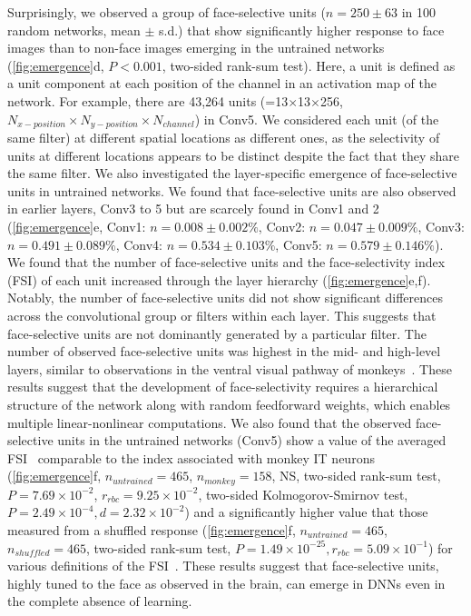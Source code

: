 \documentclass[sn-mathphys-num]{sn-jnl}%
\theoremstyle{thmstyleone}%
\theoremstyle{thmstyletwo}%
\theoremstyle{thmstylethree}%
\begin{document}
Surprisingly, we observed a group of face-selective units ($ n = 250 \pm 63 $ in 100 random networks, mean $ \pm $ s.d.) that show significantly higher response to face images than to non-face images emerging in the untrained networks (\ref{fig:emergence}d, $ P<0.001 $, two-sided rank-sum test).
Here, a unit is defined as a unit component at each position of the channel in an activation map of the network.
For example, there are 43,264 units (=13$\times$13$\times$256, $ N_{x-position} \times N_{y-position} \times N_{channel} $) in Conv5.
We considered each unit (of the same filter) at different spatial locations as different ones, as the selectivity of units at different locations appears to be distinct despite the fact that they share the same filter.
We also investigated the layer-specific emergence of face-selective units in untrained networks.
We found that face-selective units are also observed in earlier layers, Conv3 to 5 but are scarcely found in Conv1 and 2 (\ref{fig:emergence}e, 
Conv1: $ n=0.008 \pm0.002\% $, 
Conv2: $ n=0.047 \pm 0.009\% $, 
Conv3: $ n=0.491 \pm 0.089\% $, 
Conv4: $ n=0.534 \pm 0.103\% $,
Conv5: $ n=0.579 \pm 0.146\% $).
We found that the number of face-selective units and the face-selectivity index (FSI) of each unit increased through the layer hierarchy (\ref{fig:emergence}e,f).
Notably, the number of face-selective units did not show significant differences across the convolutional group or filters within each layer.
This suggests that face-selective units are not dominantly generated by a particular filter.
The number of observed face-selective units was highest in the mid- and high-level layers, similar to observations in the ventral visual pathway of monkeys~\cite{tsao2006cortical,livingstone2017development}.
These results suggest that the development of face-selectivity requires a hierarchical structure of the network along with random feedforward weights, which enables multiple linear-nonlinear computations.
We also found that the observed face-selective units in the untrained networks (Conv5) show a value of the averaged FSI~\cite{tsao2006cortical,freiwald2010functional} comparable to the index associated with monkey IT neurons (\ref{fig:emergence}f, $ n_{untrained} = 465 $, $ n_{monkey} = 158 $, NS, two-sided rank-sum test, $ P=7.69 \times 10 ^{-2} $, $ r_{rbc} = 9.25 \times 10^{-2} $, two-sided Kolmogorov-Smirnov test, $ P=2.49 \times 10^{-4}, d=2.32 \times 10^{-2} $)
and a significantly higher value that those measured from a shuffled response (\ref{fig:emergence}f, $ n_{untrained} = 465 $, $ n_{shuffled} = 465 $, two-sided rank-sum test, $ P=1.49 \times 10^{-25}, r_{rbc} = 5.09 \times 10^{-1} $) for various definitions of the FSI~\cite{tsao2006cortical,aparicio2016neurophysiological,duyck2021color}.
These results suggest that face-selective units, highly tuned to the face as observed in the brain, can emerge in DNNs even in the complete absence of learning.
\end{document}
